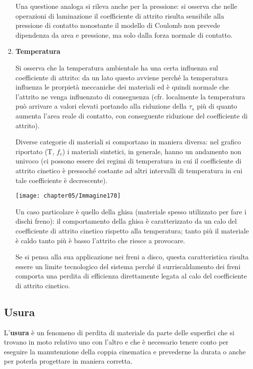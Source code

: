 \begin{enumerate}
Una questione analoga si rileva anche per la pressione: si osserva che nelle operazioni di laminazione il coefficiente di attrito risulta sensibile alla pressione di contatto nonostante il modello di Coulomb non prevede dipendenza da area e pressione, ma solo dalla forza normale di contatto.

\item \textbf{Temperatura}

Si osserva che la temperatura ambientale ha una certa influenza sul coefficiente di attrito: da un lato questo avviene perché la temperatura influenza le prorpietà meccaniche dei materiali ed è quindi normale che l'attrito ne venga influenzato di conseguenza (cfr. localmente la temperatura può arrivare a valori elevati portando alla riduzione della $\tau_s$ più di quanto aumenta l'area reale di contatto, con conseguente riduzione del coefficiente di attrito).

Diverse categorie di materiali si comportano in maniera diversa: nel grafico riportato (T, $f_c$) i materiali sintetici, in generale, hanno un andamento non univoco (ci possono essere dei regimi di temperatura in cui il coefficiente di attrito cinetico è pressoché costante ad altri intervalli di temperatura in cui tale coefficiente è decrescente).

\begin{center}
\texttt{[image: chapter05/Immagine170]}
\end{center}

Un caso particolare è quello della ghisa (materiale spesso utilizzato per fare i dischi freno): il comportamento della ghisa è caratterizzato da un calo del coefficiente di attrito cinetico rispetto alla temperatura; tanto più il materiale è caldo tanto più è basso l'attrito che riesce a provocare.

Se si pensa alla sua applicazione nei freni a disco, questa caratteristica risulta essere un limite tecnologico del sistema perché il surriscaldamento dei freni comporta una perdita di efficienza direttamente legata al calo del coefficiente di attrito cinetico.
\end{enumerate}

\subsection{Usura}

L'\textbf{usura} è un fenomeno di perdita di materiale da parte delle superfici che si trovano in moto relativo uno con l'altro e che è necessario tenere conto per	eseguire la manutenzione della coppia cinematica e prevederne la durata o anche per poterla progettare in maniera corretta.


